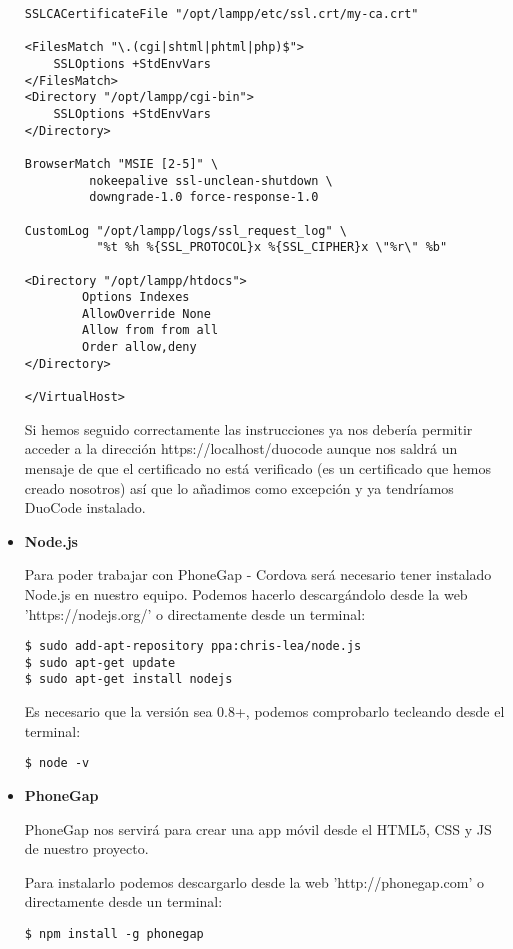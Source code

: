 \begin{itemize}
{\begin{verbatim}
SSLCACertificateFile "/opt/lampp/etc/ssl.crt/my-ca.crt"

<FilesMatch "\.(cgi|shtml|phtml|php)$">
    SSLOptions +StdEnvVars
</FilesMatch>
<Directory "/opt/lampp/cgi-bin">
    SSLOptions +StdEnvVars
</Directory>

BrowserMatch "MSIE [2-5]" \
         nokeepalive ssl-unclean-shutdown \
         downgrade-1.0 force-response-1.0

CustomLog "/opt/lampp/logs/ssl_request_log" \
          "%t %h %{SSL_PROTOCOL}x %{SSL_CIPHER}x \"%r\" %b"

<Directory "/opt/lampp/htdocs">
        Options Indexes
        AllowOverride None
        Allow from from all
        Order allow,deny
</Directory>

</VirtualHost>
\end{verbatim}
}

Si hemos seguido correctamente las instrucciones ya nos debería permitir acceder a la dirección https://localhost/duocode aunque nos saldrá un mensaje de que el certificado no está verificado (es un certificado que hemos creado nosotros) así que lo añadimos como excepción y ya tendríamos DuoCode instalado.


\item \textbf{Node.js}

Para poder trabajar con PhoneGap - Cordova será necesario tener instalado Node.js en nuestro equipo. Podemos hacerlo descargándolo desde la web 'https://nodejs.org/' o directamente desde un terminal:

{\codesize
\begin{verbatim}
$ sudo add-apt-repository ppa:chris-lea/node.js
$ sudo apt-get update
$ sudo apt-get install nodejs
\end{verbatim}
}

Es necesario que la versión sea 0.8+, podemos comprobarlo tecleando desde el terminal: 

{\codesize
\begin{verbatim}
$ node -v
\end{verbatim}
}

\item \textbf{PhoneGap}

PhoneGap nos servirá para crear una app móvil desde el HTML5, CSS y JS de nuestro proyecto.

Para instalarlo podemos descargarlo desde la web 'http://phonegap.com' o directamente desde un terminal:

{\codesize
\begin{verbatim}
$ npm install -g phonegap
\end{verbatim}
}


\end{itemize}
